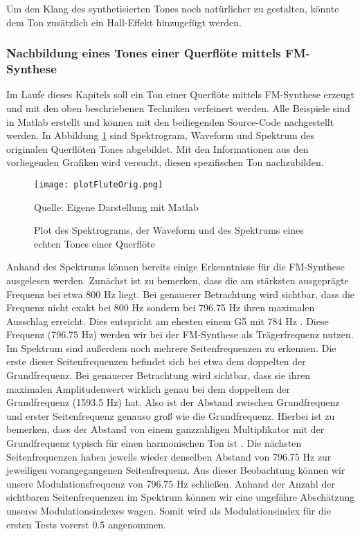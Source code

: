 Um den Klang des synthetisierten Tones noch natürlicher zu gestalten, könnte dem Ton zusätzlich ein Hall-Effekt hinzugefügt werden.


\FloatBarrier
\subsubsection{Nachbildung eines Tones einer Querflöte mittels FM-Synthese}

Im Laufe dieses Kapitels soll ein Ton einer Querflöte mittels FM-Synthese erzeugt und mit den oben beschriebenen Techniken verfeinert werden. Alle Beispiele sind in Matlab erstellt und können mit den beiliegenden Source-Code nachgestellt werden. In Abbildung \ref{fig:plotFluteOrig} sind Spektrogram, Waveform und Spektrum des originalen Querflöten Tones abgebildet. Mit den Informationen aus den vorliegenden Grafiken wird versucht, diesen spezifischen Ton nachzubilden.

\begin{figure} [h!t!b!]
\centering
  \texttt{[image: plotFluteOrig.png]}
\caption{Plot des Spektrograms, der Waveform und des Spektrums eines echten Tones einer Querflöte}
\label{fig:plotFluteOrig}
Quelle: Eigene Darstellung mit Matlab
\end{figure}

Anhand des Spektrums können bereits einige Erkenntnisse für die FM-Synthese ausgelesen werden. Zunächst ist zu bemerken, dass die am stärksten ausgeprägte Frequenz bei etwa 800 Hz liegt. Bei genauerer Betrachtung wird sichtbar, dass die Frequenz nicht exakt bei 800 Hz sondern bei 796.75 Hz ihren maximalen Ausschlag erreicht. Dies entspricht am ehesten einem G5 mit 784 Hz \cite[S. 181]{borucki}. Diese Frequenz (796.75 Hz) werden wir bei der FM-Synthese als Trägerfrequenz nutzen. Im Spektrum sind außerdem noch mehrere Seitenfrequenzen zu erkennen. Die erste dieser Seitenfrequenzen befindet sich bei etwa dem doppelten der Grundfrequenz. Bei genauerer Betrachtung wird sichtbar, dass sie ihren maximalen Amplitudenwert wirklich genau bei dem doppeltem der Grundfrequenz (1593.5 Hz) hat. Also ist der Abstand zwischen Grundfrequenz und erster Seitenfrequenz genauso groß wie die Grundfrequenz. Hierbei ist zu bemerken, dass der Abstand von einem ganzzahligen Multiplikator mit der Grundfrequenz typisch für einen harmonischen Ton ist \cite[S. 528]{chowningPaper}. Die nächsten Seitenfrequenzen haben jeweils wieder denselben Abstand von 796.75 Hz zur jeweiligen vorangegangenen Seitenfrequenz. Aus dieser Beobachtung können wir unsere Modulationsfrequenz von 796.75 Hz schließen. Anhand der Anzahl der sichtbaren Seitenfrequenzen im Spektrum können wir eine ungefähre Abschätzung unseres Modulationsindexes wagen. Somit wird als Modulationsindex für die ersten Tests vorerst 0.5 angenommen. 

